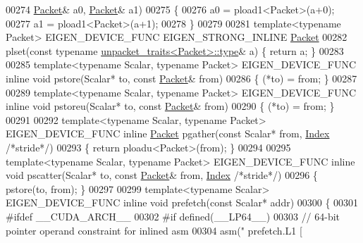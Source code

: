 \begin{DoxyCode}
00274                         \hyperlink{union_eigen_1_1internal_1_1_packet}{Packet}& a0, \hyperlink{union_eigen_1_1internal_1_1_packet}{Packet}& a1)
00275 \{
00276   a0 = pload1<Packet>(a+0);
00277   a1 = pload1<Packet>(a+1);
00278 \}
00279 
00281 \textcolor{keyword}{template}<\textcolor{keyword}{typename} Packet> EIGEN\_DEVICE\_FUNC EIGEN\_STRONG\_INLINE \hyperlink{union_eigen_1_1internal_1_1_packet}{Packet}
00282 plset(\textcolor{keyword}{const} \textcolor{keyword}{typename} \hyperlink{union_eigen_1_1internal_1_1_packet}{unpacket\_traits<Packet>::type}& a) \{ \textcolor{keywordflow}{return} a; \}
00283 
00285 \textcolor{keyword}{template}<\textcolor{keyword}{typename} Scalar, \textcolor{keyword}{typename} Packet> EIGEN\_DEVICE\_FUNC \textcolor{keyword}{inline} \textcolor{keywordtype}{void} pstore(Scalar* to, \textcolor{keyword}{const} 
      \hyperlink{union_eigen_1_1internal_1_1_packet}{Packet}& from)
00286 \{ (*to) = from; \}
00287 
00289 \textcolor{keyword}{template}<\textcolor{keyword}{typename} Scalar, \textcolor{keyword}{typename} Packet> EIGEN\_DEVICE\_FUNC \textcolor{keyword}{inline} \textcolor{keywordtype}{void} pstoreu(Scalar* to, \textcolor{keyword}{const} 
      \hyperlink{union_eigen_1_1internal_1_1_packet}{Packet}& from)
00290 \{  (*to) = from; \}
00291 
00292  \textcolor{keyword}{template}<\textcolor{keyword}{typename} Scalar, \textcolor{keyword}{typename} Packet> EIGEN\_DEVICE\_FUNC \textcolor{keyword}{inline} \hyperlink{union_eigen_1_1internal_1_1_packet}{Packet} pgather(\textcolor{keyword}{const} Scalar* 
      from, \hyperlink{namespace_eigen_a62e77e0933482dafde8fe197d9a2cfde}{Index} \textcolor{comment}{/*stride*/})
00293  \{ \textcolor{keywordflow}{return} ploadu<Packet>(from); \}
00294 
00295  \textcolor{keyword}{template}<\textcolor{keyword}{typename} Scalar, \textcolor{keyword}{typename} Packet> EIGEN\_DEVICE\_FUNC \textcolor{keyword}{inline} \textcolor{keywordtype}{void} pscatter(Scalar* to, \textcolor{keyword}{const} 
      \hyperlink{union_eigen_1_1internal_1_1_packet}{Packet}& from, \hyperlink{namespace_eigen_a62e77e0933482dafde8fe197d9a2cfde}{Index} \textcolor{comment}{/*stride*/})
00296  \{ pstore(to, from); \}
00297 
00299 \textcolor{keyword}{template}<\textcolor{keyword}{typename} Scalar> EIGEN\_DEVICE\_FUNC \textcolor{keyword}{inline} \textcolor{keywordtype}{void} prefetch(\textcolor{keyword}{const} Scalar* addr)
00300 \{
00301 \textcolor{preprocessor}{#ifdef \_\_CUDA\_ARCH\_\_}
00302 \textcolor{preprocessor}{#if defined(\_\_LP64\_\_)}
00303   \textcolor{comment}{// 64-bit pointer operand constraint for inlined asm}
00304   \textcolor{keyword}{asm}(\textcolor{stringliteral}{" prefetch.L1 [ %
}
\end{DoxyCode}
